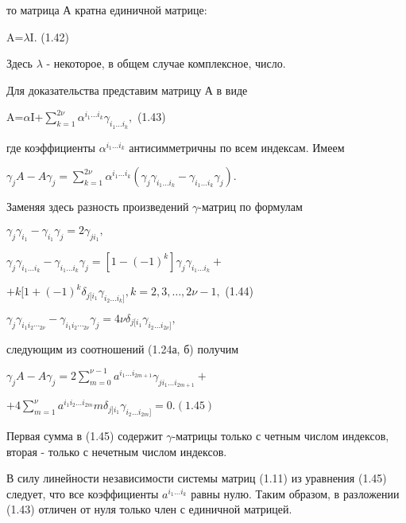 \documentclass{article}
\begin{document}
{то матрица А кратна единичной матрице:\par
\begin{center}
A=$\lambda$I.      (1.42) \par
\end{center}
Здесь $\lambda$ - некоторое, в общем случае комплексное, число.\par
Для доказательства представим матрицу А в виде \par
\begin{center}
A=$\alpha$I+$\sum_{k=1}^{2\nu}\alpha^{i_1 \dots i_k}\gamma_{i_1 \dots i_k},$      (1.43)\par
\end{center}
где коэффициенты $\alpha^{i_1 \dots i_k}$ антисимметричны по всем индексам. Имеем \par
\begin{center}
$\gamma_{j}A-A\gamma_{j}=\sum_{k=1}^{2\nu}\alpha^{i_1 \dots i_k}(\gamma_{j}\gamma_{i_1 \dots i_k}-\gamma_{i_1 \dots i_k}\gamma_{j}).$\par
\end{center}
Заменяя здесь разность произведений $\gamma$-матриц по формулам\par
\begin{center}
$\gamma_{j}\gamma_{i_1}-\gamma_{i_1}\gamma_{j}=2\gamma_{ji_1},$\par
\end{center}
$\gamma_{j}\gamma_{i_1 \dots i_k}-\gamma_{i_1 \dots i_k}\gamma_{j}=[1-(-1)^{k}]\gamma_{j}\gamma_{i_1 \dots i_k}+$\par
$+k[1+(-1)^{k}\delta_{j[i_1}\gamma_{i_2 \dots i_k]}, k=2,3,\dots,2\nu-1,$ (1.44)\par
$\gamma_{j}\gamma_{i_1 i_2\dotsi_{2\nu}}-\gamma_{i_1 i_2\dotsi_{2\nu}}\gamma_{j}=4\nu\delta_{j[i_1}\gamma_{i_2 \dots i_{2\nu}]},$\par
следующим из соотношений (1.24а, б) получим\par
$\gamma_{j}A-A\gamma_{j}=2\sum_{m=0}^{\nu-1}a^{i_1 \dots i_{2m+1}}\gamma_{ji_1\dots i_{2m+1}}+ $\par
\begin{center}
$+4\sum_{m=1}^{\nu}a^{i_1 i_2 \dots i_{2m}}m\delta_{j]i_1}\gamma_{i_2 \dots i_{2m}]}=0.     (1.45)$\par
\end{center}
Первая сумма в (1.45) содержит $\gamma$-матрицы только с четным числом индексов, вторая - только с нечетным числом индексов.\par
В силу линейности независимости системы матриц (1.11) из уравнения (1.45) следует, что все коэффициенты $a^{i_1 \dots i_k}$ равны нулю. Таким образом, в разложении (1.43) отличен  от нуля только член с единичной матрицей.\par
}
\end{document}

